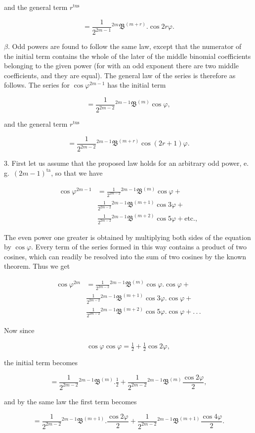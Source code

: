 \par\noindent{}%
and the general term $r^{\text{tus}}$

\[ = \frac{1}{2^{2m-1}}{}^{2m}\!\mathfrak{B}^{(m+r)}\! . \cos 2r\varphi. \]

$\beta$. Odd powers are found to follow the same law, except that
\noindent the numerator of the initial term contains the whole of the later of the middle binomial coefficients belonging to the given power (for with an odd exponent there are two middle coefficients, and they are equal). The general law of the series is therefore as follows. The series for $\cos\varphi^{2m-1}$ has the
\noindent initial term

\[ = \frac{1}{2^{2m-2}}{}^{2m-1}\!\mathfrak{B}^{(m)}\cos\varphi, \]

\noindent and the general term $r^{\text{tus}}$

\[ = \frac{1}{2^{2m-2}}{}^{2m-1}\!\mathfrak{B}^{(m+r)}\cos(2r+1)\varphi. \]

3. First let us assume that the proposed law holds for an arbitrary odd power, e.\,g.\ $(2m-1)^{\text{ta}}$, so that we have

\[
\begin{aligned}
\cos\varphi^{2m-1} & = \frac{1}{2^{2m-2}}{}^{2m-1}\!\mathfrak{B}^{(m)}\cos\varphi +\\
&{} \frac{1}{2^{2m-2}}{}^{2m-1}\!\mathfrak{B}^{(m+1)}\cos 3\varphi +\\
&{} \frac{1}{2^{2m-2}}{}^{2m-1}\!\mathfrak{B}^{(m+2)}\cos 5\varphi + \text{etc.},
\end{aligned}
\]

\noindent The even power one greater is obtained by multiplying both sides of the equation by $\cos\varphi$. Every term of the series formed in this way contains a product of two cosines, which can readily be resolved into the sum of two cosines by the known theorem. Thus we get

\[
\begin{aligned}
\cos\varphi^{2m} & = \frac{1}{2^{2m-2}}{}^{2m-1}\!\mathfrak{B}^{(m)}\cos\varphi . \cos\varphi +\\
&{} \frac{1}{2^{2m-2}}{}^{2m-1}\!\mathfrak{B}^{(m+1)}\cos 3\varphi . \cos\varphi +\\
&{} \frac{1}{2^{2m-2}}{}^{2m-1}\!\mathfrak{B}^{(m+2)}\cos 5\varphi . \cos\varphi + .\,.\,.
\end{aligned}
\]

\noindent Now since

\[ \cos\varphi\cos\varphi = \tfrac12+\tfrac12\cos 2\varphi, \]

\noindent the initial term becomes

\[ = \frac{1}{2^{2m-2}}{}^{2m-1}\!\mathfrak{B}^{(m)} . \tfrac12 +
\frac{1}{2^{2m-2}}{}^{2m-1}\!\mathfrak{B}^{(m)}\frac{\cos 2\varphi}{2}, \]

\noindent and by the same law the first term becomes

\[ = \frac{1}{2^{2m-2}}{}^{2m-1}\!\mathfrak{B}^{(m+1)} . \frac{\cos 2\varphi}{2} +
\frac{1}{2^{2m-2}}{}^{2m-1}\!\mathfrak{B}^{(m+1)}\frac{\cos 4\varphi}{2}. \]
